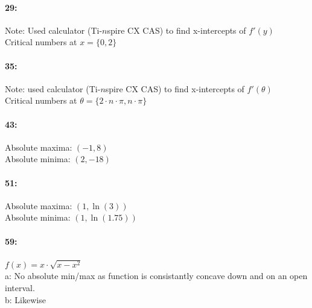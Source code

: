 \documentclass[12pt]{article}
\begin{document}
    \paragraph*{29:\\}
        Note: Used calculator (Ti-$n$spire CX CAS) to find x-intercepts of \begin {math} f'(y) \end {math} \\
        Critical numbers at \begin{math} x=\{0, 2\} \end {math}\\ 

    \paragraph*{35:\\}
        Note: used calculator (Ti-$n$spire CX CAS) to find x-intercepts of \begin{math} f'(\theta) \end{math} \\
        Critical numbers at \begin{math} \theta=\{2 \cdot n \cdot \pi, n \cdot \pi\} \end{math} \\

    \paragraph*{43:\\}
        Absolute maxima: $(-1, 8)$\\ Absolute minima: $(2, -18)$\\

    \paragraph*{51:\\}
        Absolute maxima: $(1, \ln(3))$\\ Absolute minima: $(1, \ln(1.75))$\\

    \paragraph*{59:\\}
        $f(x) = x\cdot \sqrt{x-x^2}$\\
        a: No absolute min/max as function is consistantly concave down and on an open interval.\\
        b: Likewise
\end{document}
